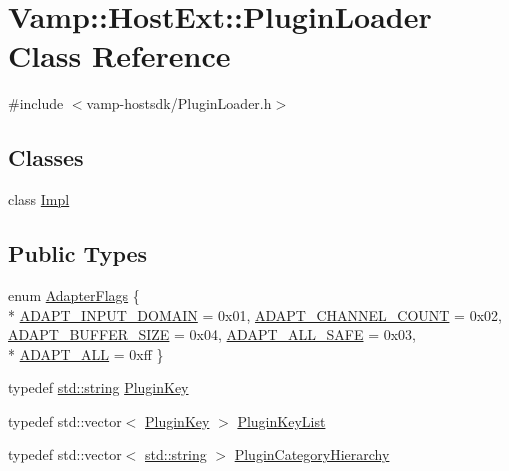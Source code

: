 \hypertarget{class_vamp_1_1_host_ext_1_1_plugin_loader}{}\section{Vamp\+:\+:Host\+Ext\+:\+:Plugin\+Loader Class Reference}
\label{class_vamp_1_1_host_ext_1_1_plugin_loader}


{\ttfamily \#include $<$vamp-\/hostsdk/\+Plugin\+Loader.\+h$>$}

\subsection*{Classes}
\begin{DoxyCompactItemize}
\item 
class \hyperlink{class_vamp_1_1_host_ext_1_1_plugin_loader_1_1_impl}{Impl}
\end{DoxyCompactItemize}
\subsection*{Public Types}
\begin{DoxyCompactItemize}
\item 
enum \hyperlink{class_vamp_1_1_host_ext_1_1_plugin_loader_aff3ee11692ce25e0dfb904324cbe3494}{Adapter\+Flags} \{ \\*
\hyperlink{class_vamp_1_1_host_ext_1_1_plugin_loader_aff3ee11692ce25e0dfb904324cbe3494a763a9a0caf512d9671b90c05c2808a09}{A\+D\+A\+P\+T\+\_\+\+I\+N\+P\+U\+T\+\_\+\+D\+O\+M\+A\+IN} = 0x01, 
\hyperlink{class_vamp_1_1_host_ext_1_1_plugin_loader_aff3ee11692ce25e0dfb904324cbe3494a54c43b85382d78e8ea8da192bce3a139}{A\+D\+A\+P\+T\+\_\+\+C\+H\+A\+N\+N\+E\+L\+\_\+\+C\+O\+U\+NT} = 0x02, 
\hyperlink{class_vamp_1_1_host_ext_1_1_plugin_loader_aff3ee11692ce25e0dfb904324cbe3494a5c0c389797922630a6b54ffd1eed21f1}{A\+D\+A\+P\+T\+\_\+\+B\+U\+F\+F\+E\+R\+\_\+\+S\+I\+ZE} = 0x04, 
\hyperlink{class_vamp_1_1_host_ext_1_1_plugin_loader_aff3ee11692ce25e0dfb904324cbe3494a8220529e851ae30d37f413c40a389e08}{A\+D\+A\+P\+T\+\_\+\+A\+L\+L\+\_\+\+S\+A\+FE} = 0x03, 
\\*
\hyperlink{class_vamp_1_1_host_ext_1_1_plugin_loader_aff3ee11692ce25e0dfb904324cbe3494a3b1e08415c0cbc96f7900eac955ad6d0}{A\+D\+A\+P\+T\+\_\+\+A\+LL} = 0xff
 \}
\item 
typedef \hyperlink{test__lib_f_l_a_c_2format_8c_ab02026ad0de9fb6c1b4233deb0a00c75}{std\+::string} \hyperlink{class_vamp_1_1_host_ext_1_1_plugin_loader_a473645bbb3ac5c1a0da2f0f482947c4d}{Plugin\+Key}
\item 
typedef std\+::vector$<$ \hyperlink{class_vamp_1_1_host_ext_1_1_plugin_loader_a473645bbb3ac5c1a0da2f0f482947c4d}{Plugin\+Key} $>$ \hyperlink{class_vamp_1_1_host_ext_1_1_plugin_loader_a0d48b76e4f995110f53e0feeb23f733a}{Plugin\+Key\+List}
\item 
typedef std\+::vector$<$ \hyperlink{test__lib_f_l_a_c_2format_8c_ab02026ad0de9fb6c1b4233deb0a00c75}{std\+::string} $>$ \hyperlink{class_vamp_1_1_host_ext_1_1_plugin_loader_ad6a39aa0c79d8d9209eb0b8dfe9d1364}{Plugin\+Category\+Hierarchy}
\end{DoxyCompactItemize}
